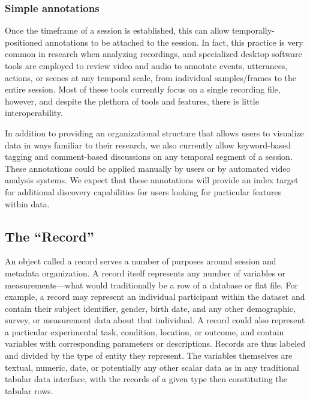 \documentclass{sig-alternate}
\begin{document}
\subsubsection*{Simple annotations}

Once the timeframe of a session is established, this can allow temporally-positioned annotations to be attached to the session.
In fact, this practice is very common in research when analyzing recordings, and specialized desktop software tools are employed to review video and audio to annotate events, utterances, actions, or scenes at any temporal scale, from individual samples/frames to the entire session.
Most of these tools currently focus on a single recording file, however, and despite the plethora of tools and features, there is little interoperability.

In addition to providing an organizational structure that allows users to visualize data in ways familiar to their research, we also currently allow keyword-based tagging and comment-based discussions on any temporal segment of a session.
These annotations could be applied manually by users or by automated video analysis systems.
We expect that these annotations will provide an index target for additional discovery capabilities for users looking for particular features within data.


\subsection{The ``Record''}

An object called a record serves a number of purposes around session and metadata organization. 
A record itself represents any number of variables or measurements---what would traditionally be a row of a database or flat file.
For example, a record may represent an individual participant within the dataset and contain their subject identifier, gender, birth date, and any other demographic, survey, or measurement data about that individual.
A record could also represent a particular experimental task, condition, location, or outcome, and contain variables with corresponding parameters or descriptions.
Records are thus labeled and divided by the type of entity they represent.
The variables themselves are textual, numeric, date, or potentially any other scalar data as in any traditional tabular data interface, with the records of a given type then constituting the tabular rows.
\end{document}

